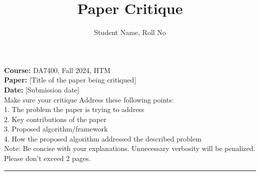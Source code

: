 \documentclass[11pt,a4paper]{article}
\title{\textbf{Paper Critique}}
\author{Student Name, Roll No}
\date{}
\begin{document}
\maketitle
\vspace{-0.6in}
\noindent\textbf{Course:} DA7400, Fall 2024, IITM \\
\textbf{Paper:} [Title of the paper being critiqued] \\
\textbf{Date:} [Submission date]
\vspace{0.5cm}\\
Make sure your critique Address these following points:\\
1. The problem the paper is trying to address\\
2. Key contributions of the paper\\
3. Proposed algorithm/framework\\
4. How the proposed algorithm addressed the described problem\\
Note: Be concise with your explanations. Unnecessary verbosity will be penalized. Please don't exceed 2 pages.
\vspace{0.5cm}
\hrule
\end{document}
